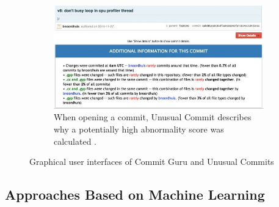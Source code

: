 \begin{figure}[p!]
	\begin{subfigure}[t]{.75\textwidth}
		\includegraphics[width=\textwidth]{images/ui/unusualcommits/commit-details-smaller}
		\caption{When opening a commit, Unusual Commit describes why a potentially high abnormality score was calculated \cite{Goyal2017}.}
		\label{fig:ui-unusualcommits-details}
	\end{subfigure}
	\caption{Graphical user interfaces of Commit Guru \cite{Rosen2015} and Unusual Commits \cite{Goyal2017}}
	\label{fig:ui}
\end{figure}



\subsection{Approaches Based on Machine Learning}
\label{sec:comparison-ml}

